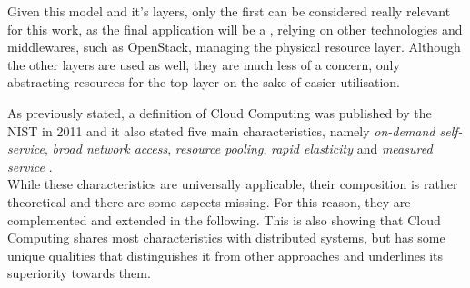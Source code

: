 Given this model and it's layers, only the first can be considered really relevant for this work, as the final application will be a , relying on other technologies and middlewares, such as OpenStack, managing the physical resource layer. Although the other layers are used as well, they are much less of a concern, only abstracting resources for the top layer on the sake of easier utilisation.

As previously stated, a definition of Cloud Computing was published by the NIST in 2011 and it also stated five main characteristics, namely \textit{on-demand self-service}, \textit{broad network access}, \textit{resource pooling}, \textit{rapid elasticity} and \textit{measured service} \cite{mell2011nist}. \\
While these characteristics are universally applicable, their composition is rather theoretical and there are some aspects missing. For this reason, they are complemented and extended in the following. This is also showing that Cloud Computing shares most characteristics with distributed systems, but has some unique qualities that distinguishes it from other approaches and underlines its superiority towards them.

